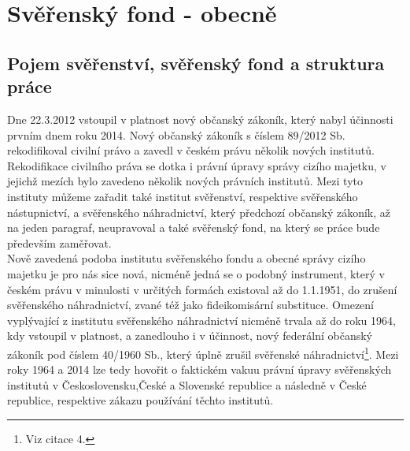 \documentclass{article}
\begin{document}
\newpage

\section{Svěřenský fond - obecně}

\subsection{Pojem svěřenství, svěřenský fond a struktura práce}


\indent Dne 22.3.2012 vstoupil v platnost nový občanský zákoník, který nabyl účinnosti prvním dnem roku 2014. Nový občanský zákoník s číslem 89/2012 Sb. rekodifikoval civilní právo a zavedl v českém právu několik nových institutů. Rekodifikace civilního práva se dotka i právní úpravy správy cizího majetku, v jejichž mezích bylo zavedeno několik nových právních institutů. Mezi tyto instituty můžeme zařadit také institut svěřenství, respektive svěřenského nástupnictví, a svěřenského náhradnictví, který předchozí občanský zákoník, až na jeden paragraf, neupravoval a také svěřenský fond, na který se práce bude především zaměřovat. \\

\indent Nově zavedená podoba institutu svěřenského fondu a obecné správy cizího majetku je pro nás sice nová, nicméně jedná se o podobný instrument, který v českém právu v minulosti v určitých formách existoval až do 1.1.1951, do zrušení svěřens\-kého náhradnictví, zvané též jako fideikomisární substituce. Omezení vyplývající z institutu svěřenského náhradnictví nicméně trvala až do roku 1964, kdy vstoupil v platnost, a zanedlouho i v účinnost, nový federální občanský zákoník pod číslem 40/1960 Sb., který úplně zrušil svěřenské náhradnictví\footnote{Viz citace 4.}. Mezi roky 1964 a 2014 lze tedy hovořit o faktickém vakuu právní úpravy svěřen\-ských institutů v Československu,České a Slovenské republice a následně v České republice, respektive zákazu používání těchto institutů.\\
\end{document}
